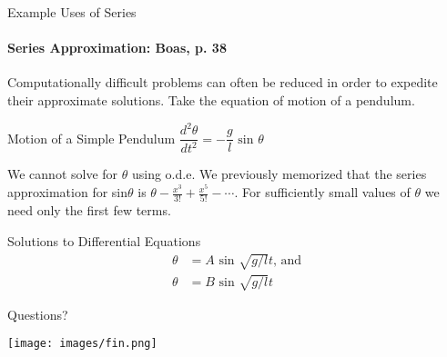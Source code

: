 \documentclass{beamer}
\begin{document}
\begin{frame}{Example Uses of Series}
	\framesubtitle{Series Approximation: Boas, p. 38}
	Computationally difficult problems can often be reduced in order to expedite their approximate solutions.  Take the equation of motion of a pendulum.
	\begin{exampleblock}{Motion of a Simple Pendulum}
	$\dfrac{d^{2}\theta}{dt^{2}} = -\dfrac{g}{l}\mbox{~sin\ }\theta$
	\end{exampleblock}
	We cannot solve for $\theta$ using o.d.e.  We previously memorized that the series approximation for sin$\theta$ is $\theta - \frac{x^{3}}{3!}+\frac{x^{5}}{5!}-\cdots$.  For sufficiently small values of $\theta$ we need only the first few terms.
	\begin{exampleblock}{Solutions to Differential Equations}
	\begin{align*}
	\theta &= A \mbox{~sin\ }\sqrt{g/l}t \mbox{, and} \\
	\theta &= B \mbox{~sin\ }\sqrt{g/l}t
	\end{align*}
	\end{exampleblock}
\end{frame}
  
\begin{frame}{Questions?}
	\begin{center}
		\texttt{[image: images/fin.png]}
	\end{center}
\end{frame}
\end{document}
